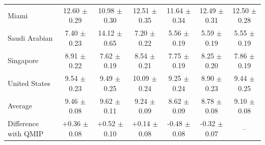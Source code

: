 \begin{tabular}{lcccccc}
Miami & 12.60 $\pm$ 0.29 & 10.98 $\pm$ 0.30 & 12.51 $\pm$ 0.35 & 11.64 $\pm$ 0.34 & 12.49 $\pm$ 0.31 & 12.50 $\pm$ 0.28 \\
Saudi Arabian & 7.40 $\pm$ 0.23 & 14.12 $\pm$ 0.65 & 7.20 $\pm$ 0.22 & 5.56 $\pm$ 0.19 & 5.59 $\pm$ 0.19 & 5.55 $\pm$ 0.19 \\
Singapore & 8.91 $\pm$ 0.22 & 7.62 $\pm$ 0.19 & 8.54 $\pm$ 0.21 & 7.75 $\pm$ 0.19 & 8.25 $\pm$ 0.20 & 7.86 $\pm$ 0.19 \\
United States & 9.54 $\pm$ 0.23 & 9.49 $\pm$ 0.25 & 10.09 $\pm$ 0.24 & 9.25 $\pm$ 0.24 & 8.90 $\pm$ 0.23 & 9.44 $\pm$ 0.25 \\
\midrule
Average & 9.46 $\pm$ 0.08 & 9.62 $\pm$ 0.11 & 9.24 $\pm$ 0.09 & 8.62 $\pm$ 0.09 & 8.78 $\pm$ 0.08 & 9.10 $\pm$ 0.08 \\
Difference with QMIP & +0.36 $\pm$ 0.08 & +0.52 $\pm$ 0.10 & +0.14 $\pm$ 0.08 & -0.48 $\pm$ 0.08 & -0.32 $\pm$ 0.07 & -- \\
\bottomrule
\end{tabular}
